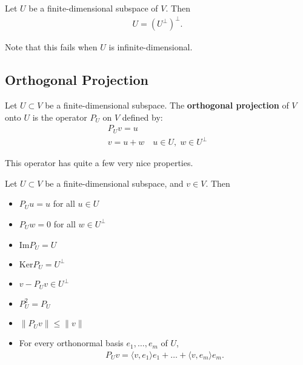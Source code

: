 \documentclass{memoir}
\begin{document}
\begin{thm}
	Let \(U\) be a finite-dimensional subspace of \(V\). Then
	\begin{align*}
		U = (U^{\perp})^{\perp}.
	\end{align*}
\end{thm}
Note that this fails when \(U\) is infinite-dimensional.

\subsection{Orthogonal Projection}
\label{subsec:orthogonal_projection}

\begin{defn}
	Let \(U\subset V\) be a finite-dimensional subspace. The \textbf{orthogonal projection} of \(V\) onto \(U\) is the operator \(P_U\) on \(V\) defined by:
	\begin{align*}
		P_Uv = u\\
		v = u + w \quad u \in U, \; w \in U^{\perp}
	\end{align*}
\end{defn}
This operator has quite a few very nice properties.

\begin{prop}
	Let \(U\subset V\) be a finite-dimensional subspace, and \(v \in V\). Then
	\begin{itemize}
		\item \(P_U u = u\) for all \(u \in U\) 
		\item \(P_U w = 0\) for all \(w \in U^{\perp}\) 
		\item \(\textrm{Im}P_U = U\) 
		\item \(\textrm{Ker}P_U = U^{\perp}\) 
		\item \(v - P_U v \in U^{\perp}\) 
		\item \(P_U^2 = P_U\) 
		\item \(\|P_U v\|\leq \|v\|\) 
		\item For every orthonormal basis \(e_1,\ldots,e_m\) of \(U\),
			\begin{align*}
				P_U v = \langle v,e_1 \rangle e_1 + \ldots + \langle v,e_m \rangle e_m.
			\end{align*}
	\end{itemize}
\end{prop}
\end{document}
